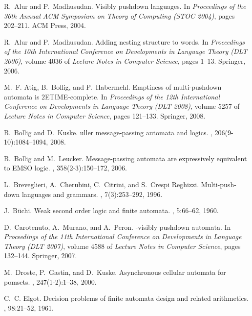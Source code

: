 \documentclass{LMCS}
\begin{document}
\begin{thebibliography}{10}

R.~Alur and P.~Madhusudan.
\newblock Visibly pushdown languages.
\newblock In {\em Proceedings of the 36th Annual ACM Symposium on Theory of
  Computing (STOC 2004)}, pages 202--211. ACM Press, 2004.

R.~Alur and P.~Madhusudan.
\newblock Adding nesting structure to words.
\newblock In {\em Proceedings of the 10th International Conference on
  Developments in Language Theory (DLT 2006)}, volume 4036 of {\em Lecture
  Notes in Computer Science}, pages 1--13. Springer, 2006.

M.~F. Atig, B.~Bollig, and P.~Habermehl.
\newblock Emptiness of multi-pushdown automata is \(2\){ETIME}-complete.
\newblock In {\em {P}roceedings of the 12th {I}nternational {C}onference on
  {D}evelopments in {L}anguage {T}heory (DLT 2008)}, volume 5257 of {\em
  Lecture Notes in Computer Science}, pages 121--133. Springer, 2008.

B.~Bollig and D.~Kuske.
uller message-passing automata and logics.
, 206(9-10):1084--1094, 2008.

B.~Bollig and M.~Leucker.
\newblock Message-passing automata are expressively equivalent to {EMSO} logic.
, 358(2-3):150--172, 2006.

L.~Breveglieri, A.~Cherubini, C.~Citrini, and S.~{Crespi Reghizzi}.
\newblock Multi-push-down languages and grammars.
,
  7(3):253--292, 1996.

J.~B{\"u}chi.
\newblock Weak second order logic and finite automata.
, 5:66--62, 1960.

D.~Carotenuto, A.~Murano, and A.~Peron.
-visibly pushdown automata.
\newblock In {\em Proceedings of the 11th International Conference on
  Developments in Language Theory (DLT 2007)}, volume 4588 of {\em Lecture
  Notes in Computer Science}, pages 132--144. Springer, 2007.

M.~Droste, P.~Gastin, and D.~Kuske.
\newblock Asynchronous cellular automata for pomsets.
, 247(1-2):1--38, 2000.

C.~C. Elgot.
\newblock Decision problems of finite automata design and related arithmetics.
, 98:21--52, 1961.


\end{thebibliography}
\end{document}
